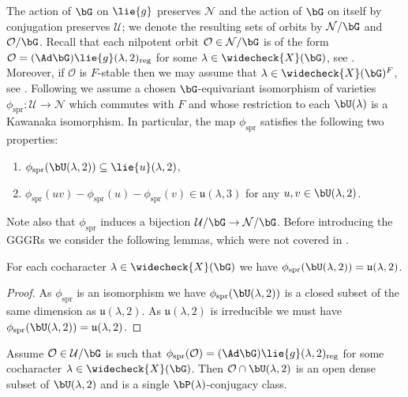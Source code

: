 \documentclass[eqthmnum, nocolour]{jt-calcs}
\begin{document}
\begin{pa}
The action of $\bG$ on $\lie{g}$ preserves $\mathcal{N}$ and the action of $\bG$ on itself by conjugation preserves $\mathcal{U}$; we denote the resulting sets of orbits by $\mathcal{N}/\bG$ and $\mathcal{O}/\bG$. Recall that each nilpotent orbit $\mathcal{O} \in \mathcal{N}/\bG$ is of the form $\mathcal{O} = (\Ad\bG)\lie{g}(\lambda,2)_{\mathrm{reg}}$ for some $\lambda \in \widecheck{X}(\bG)$, see \cite[3.22]{taylor:2016:GGGRs-small-characteristics}. Moreover, if $\mathcal{O}$ is $F$-stable then we may assume that $\lambda \in \widecheck{X}(\bG)^F$, see \cite[3.25]{taylor:2016:GGGRs-small-characteristics}. Following \cite[\S4, \S5]{taylor:2016:GGGRs-small-characteristics} we assume a chosen $\bG$-equivariant isomorphism of varieties $\phi_{\mathrm{spr}} : \mathcal{U} \to \mathcal{N}$ which commutes with $F$ and whose restriction to each $\bU(\lambda)$ is a Kawanaka isomorphism. In particular, the map $\phi_{\mathrm{spr}}$ satisfies the following two properties:
\begin{enumerate}[label=(K\arabic*)]
	\item $\phi_{\mathrm{spr}}(\bU(\lambda,2)) \subseteq \lie{u}(\lambda,2)$,
	\item $\phi_{\mathrm{spr}}(uv) - \phi_{\mathrm{spr}}(u) - \phi_{\mathrm{spr}}(v) \in \mathfrak{u}(\lambda,3)$ for any $u,v \in \bU(\lambda,2)$.
\end{enumerate}
Note also that $\phi_{\mathrm{spr}}$ induces a bijection $\mathcal{U}/\bG \to \mathcal{N}/\bG$. Before introducing the GGGRs we consider the following lemmas, which were not covered in \cite{taylor:2016:GGGRs-small-characteristics}.
\end{pa}

\begin{lem}\label{lem:kaw-iso-eq}
For each cocharacter $\lambda \in \widecheck{X}(\bG)$ we have $\phi_{\mathrm{spr}}(\bU(\lambda,2)) = \mathfrak{u}(\lambda,2)$.
\end{lem}

\begin{proof}
As $\phi_{\mathrm{spr}}$ is an isomorphism we have $\phi_{\mathrm{spr}}(\bU(\lambda,2))$ is a closed subset of the same dimension as $\mathfrak{u}(\lambda,2)$. As $\mathfrak{u}(\lambda,2)$ is irreducible we must have $\phi_{\mathrm{spr}}(\bU(\lambda,2)) = \mathfrak{u}(\lambda,2)$.
\end{proof}

\begin{lem}\label{lem:P-conj}
Assume $\mathcal{O} \in \mathcal{U}/\bG$ is such that $\phi_{\mathrm{spr}}(\mathcal{O}) = (\Ad\bG)\lie{g}(\lambda,2)_{\mathrm{reg}}$ for some cocharacter $\lambda \in \widecheck{X}(\bG)$. Then $\mathcal{O} \cap \bU(\lambda,2)$ is an open dense subset of $\bU(\lambda,2)$ and is a single $\bP(\lambda)$-conjugacy class.
\end{lem}
\end{document}
